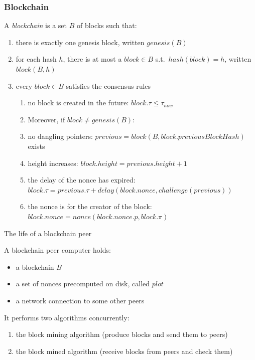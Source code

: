 \documentclass[11pt]{beamer}  %
\newcommand{\nonce}{{\mathit{nonce}}}
\newcommand{\plot}{{\mathit{plot}}}
\newcommand{\previous}{{\mathit{previous}}}
\newcommand{\challenge}{{\mathit{challenge}}}
\newcommand{\delay}{{\mathit{delay}}}
\newcommand{\height}{{\mathit{height}}}
\renewcommand{\block}{{\mathit{block}}}
\newcommand{\now}{{\mathit{now}}}
\newcommand{\hash}{{\mathit{hash}}}
\newcommand{\previousblockhash}{{\mathit{previousBlockHash}}}
\newcommand{\genesis}{{\mathit{genesis}}}
\begin{document}
\begin{frame}\frametitle{Blockchain}

  A \emph{blockchain} is a set $B$ of blocks such that:
  \begin{enumerate}
    \pause
  \item there is exactly one genesis block, written $\genesis(B)$
    \pause
  \item for each hash $h$, there is at most a $\block\in B$ s.t.\ $\hash(\block)=h$,
    written $\block(B,h)$
    \pause
  \item every $\block\in B$ satisfies the {\color{red}consensus rules}
    \begin{enumerate}
      \pause
    \item[a] {\color{red}no block is created in the future:} $\block.\tau\le\tau_\now$
      \pause
    \item[] Moreover, if $\block\not=\genesis(B)$:
      \pause
    \item[b] {\color{red}no dangling pointers:}
      $\previous=\block(B,\block.\previousblockhash)$ exists
      \pause
    \item[c] {\color{red}height increases:} $\block.\height=\previous.\height+1$
      \pause
    \item[d] {\color{red}the delay of the nonce has expired:} $\block.\tau=\previous.\tau+\delay(\block.\nonce,\challenge(\previous))$
      \pause
    \item[e] {\color{red}the nonce is for the creator of the block:}
      $\block.\nonce=\nonce(\block.\nonce.p,\block.\pi)$
    \end{enumerate}
  \end{enumerate}
\end{frame}

\begin{frame}{The life of a blockchain peer}

  A blockchain peer computer holds:
  \begin{itemize}
  \item a blockchain $B$
  \item a set of nonces precomputed on disk, called $\plot$
  \item a network connection to some other peers
  \end{itemize}

  \bigskip
  \pause
  It performs two algorithms concurrently:
  \begin{enumerate}
    \pause
  \item the block mining algorithm (produce blocks and send them to peers)
    \pause
  \item the block mined algorithm (receive blocks from peers and check them)
  \end{enumerate}

\end{frame}
\end{document}
